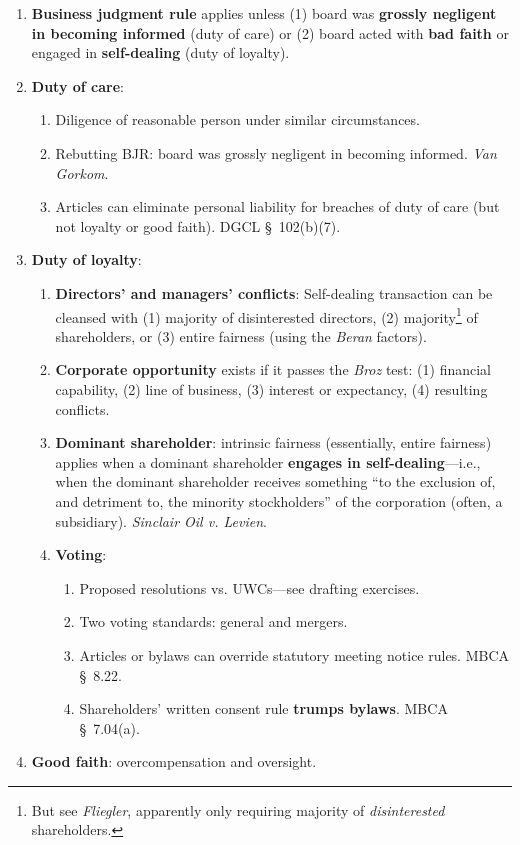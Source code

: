 \begin{enumerate}
    \item \textbf{Business judgment rule} applies unless (1) board was 
    \textbf{grossly negligent in becoming informed} (duty of care) or (2) 
    board acted with \textbf{bad faith} or engaged in \textbf{self-dealing} 
    (duty of loyalty).
    \item \textbf{Duty of care}:
    \begin{enumerate}
        \item Diligence of reasonable person under similar circumstances.
        \item Rebutting BJR: board was grossly negligent in becoming 
        informed. \emph{Van Gorkom}.
        \item Articles can eliminate personal liability for breaches of duty 
        of care (but not loyalty or good faith). DGCL \S\ 102(b)(7).
    \end{enumerate}
    \item \textbf{Duty of loyalty}:
    \begin{enumerate}
        \item \textbf{Directors' and managers' conflicts}: Self-dealing 
        transaction can be cleansed with (1) majority of disinterested 
        directors, (2) majority\footnote{But see \emph{Fliegler}, apparently 
        only requiring majority of \emph{disinterested} shareholders.} of 
        shareholders, or (3) entire fairness (using the \emph{Beran} factors).
        \item \textbf{Corporate opportunity} exists if it passes the 
        \emph{Broz} test: (1) financial capability, (2) line of business, (3) 
        interest or expectancy, (4) resulting conflicts.
        \item \textbf{Dominant shareholder}: intrinsic fairness (essentially, 
        entire fairness) applies when a dominant shareholder \textbf{engages 
        in self-dealing}---i.e., when the dominant shareholder receives 
        something ``to the exclusion of, and detriment to, the minority 
        stockholders'' of the corporation (often, a subsidiary).  
        \emph{Sinclair Oil v. Levien}.
        \item \textbf{Voting}:
        \begin{enumerate}
            \item Proposed resolutions vs. UWCs---see drafting exercises.
            \item Two voting standards: general and mergers.
            \item Articles or bylaws can override statutory meeting notice 
            rules. MBCA \S\ 8.22.
            \item Shareholders' written consent rule \textbf{trumps bylaws}. 
            MBCA \S\ 7.04(a). 
        \end{enumerate}
    \end{enumerate}
    \item \textbf{Good faith}: overcompensation and oversight.
\end{enumerate}

